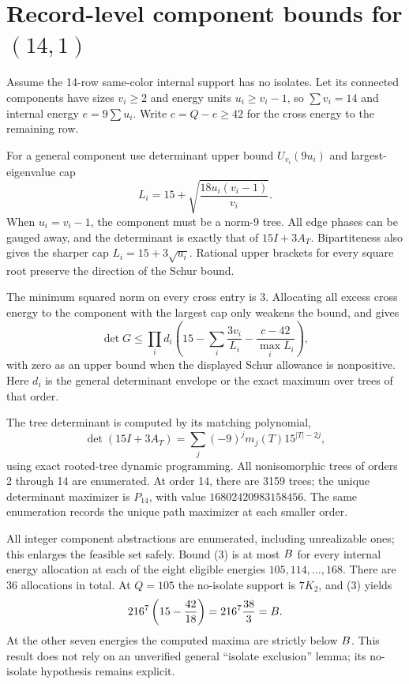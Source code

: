 \documentclass[11pt,a4paper]{article}
\begin{document}
\section{Record-level component bounds for $(14,1)$}
Assume the 14-row same-color internal support has no isolates. Let its connected components have sizes $v_i\ge2$ and energy units $u_i\ge v_i-1$, so $\sum v_i=14$ and internal energy $e=9\sum u_i$. Write $c=Q-e\ge42$ for the cross energy to the remaining row.

For a general component use determinant upper bound $U_{v_i}(9u_i)$ and largest-eigenvalue cap
\[
 L_i=15+\sqrt{\frac{18u_i(v_i-1)}{v_i}}.
\]
When $u_i=v_i-1$, the component must be a norm-9 tree. All edge phases can be gauged away, and the determinant is exactly that of $15I+3A_T$. Bipartiteness also gives the sharper cap $L_i=15+3\sqrt{u_i}$. Rational upper brackets for every square root preserve the direction of the Schur bound.

The minimum squared norm on every cross entry is 3. Allocating all excess cross energy to the component with the largest cap only weakens the bound, and gives
\[
 \det G\le\prod_i d_i\left(15-\sum_i\frac{3v_i}{L_i}
                  -\frac{c-42}{\max_iL_i}\right),       \tag{3}
\]
with zero as an upper bound when the displayed Schur allowance is nonpositive. Here $d_i$ is the general determinant envelope or the exact maximum over trees of that order.

The tree determinant is computed by its matching polynomial,
\[
 \det(15I+3A_T)=\sum_j(-9)^j m_j(T)15^{|T|-2j},
\]
using exact rooted-tree dynamic programming. All nonisomorphic trees of orders 2 through 14 are enumerated. At order 14, there are 3159 trees; the unique determinant maximizer is $P_{14}$, with value $16802420983158456$. The same enumeration records the unique path maximizer at each smaller order.

All integer component abstractions are enumerated, including unrealizable ones; this enlarges the feasible set safely. Bound (3) is at most $B$ for every internal energy allocation at each of the eight eligible energies $105,114,\ldots,168$. There are 36 allocations in total. At $Q=105$ the no-isolate support is $7K_2$, and (3) yields
\[
 216^7\left(15-\frac{42}{18}\right)=216^7\frac{38}{3}=B.
\]
At the other seven energies the computed maxima are strictly below $B$. This result does not rely on an unverified general ``isolate exclusion'' lemma; its no-isolate hypothesis remains explicit.
\end{document}
